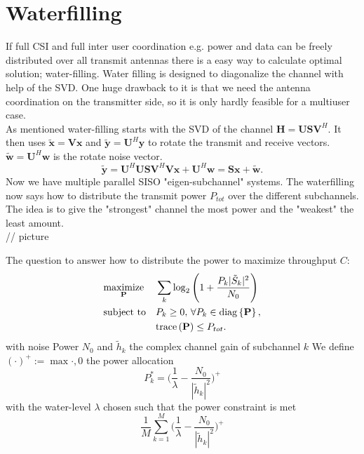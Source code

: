 \section{Waterfilling}
If full CSI and full inter user coordination e.g. power and data can be freely distributed over all transmit antennas there is a easy way to calculate optimal solution; water-filling. Water filling is designed to diagonalize the channel with help of the SVD. One huge drawback to it is that we need the antenna coordination on the transmitter side, so it is only hardly feasible for a multiuser case.\\
As mentioned water-filling starts with the SVD of the channel $\mathbf{H} = \mathbf{USV}^H$. It then uses $\mathbf{\tilde{x}} = \mathbf{Vx}$ and $\mathbf{\tilde{y}} = \mathbf{U}^H\mathbf{y}$ to rotate the transmit and receive vectors. $\mathbf{\tilde{w}} = \mathbf{U}^H\mathbf{w}$ is the rotate noise vector.
\begin{equation}
	\mathbf{\tilde{y}} 
	= \mathbf{U}^H\mathbf{USV}^H\mathbf{Vx}+\mathbf{U}^H\mathbf{w}
	= \mathbf{Sx + \tilde{w}}.
\end{equation}
Now we have multiple parallel SISO "eigen-subchannel" systems. The waterfilling now says how to distribute the transmit power $P_{tot}$ over the different subchannels. The idea is to give the "strongest" channel the most power and the "weakest" the least amount.\\

// picture

The question to answer how to distribute the power to maximize throughput $C$:
\begin{equation}
	\begin{aligned}
		& \underset{\mathbf{P}}{\text{maximize}}
		& & \sum_k{\log_2{\Biggr(1+\frac{P_k|\tilde{S}_k|^2}{N_0}\Biggl)}} \\
		& \text{subject to}
		& & P_k\geq 0,\,\forall P_k\in \mathrm{diag}\left\lbrace\mathbf{P}\right\rbrace, \\
		&&& \text{trace}\left(\mathbf{P}\right)\leq P_{tot}.
	\end{aligned}
\end{equation}
with noise Power $N_0$ and $\tilde{h}_k$ the complex channel gain of subchannel $k$
We define $(\cdot)^+ := \max{\cdot,0}$ the power allocation
\begin{equation}
	P_k^* = \Biggr(\frac{1}{\lambda}-\frac{N_0}{|\tilde{h}_k|^2}\Biggl)^+
\end{equation}
with the water-level $\lambda$ chosen such that the power constraint is met
\begin{equation}
	\frac{1}{M}\sum_{k=1}^M{\Biggr(\frac{1}{\lambda}-\frac{N_0}{|\tilde{h}_k|^2}\Biggl)^+}
\end{equation}


